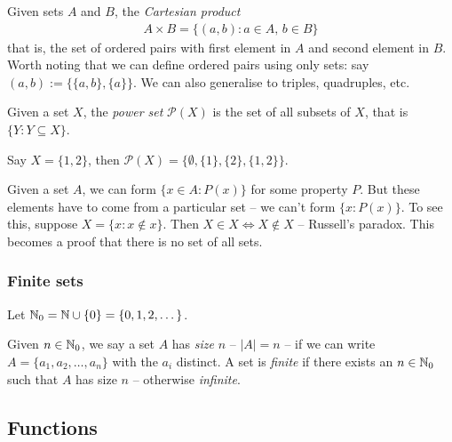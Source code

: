 \documentclass{../template/note}
\begin{document}
    \begin{definition}
        Given sets \(A\) and \(B\), the \emph{Cartesian product}
        \begin{align*}
            A \times B = \{(a, b): a \in A,\, b \in B\}
        \end{align*}
        that is, the set of ordered pairs with first element in \(A\) and second element in \(B\). Worth noting that we can define ordered pairs using only sets: say \((a, b) := \{\{a, b\}, \{a\}\}\). We can also generalise to triples, quadruples, etc.
        
    \end{definition}
    
    \begin{definition}
        Given a set \(X\), the \emph{power set} \(\mathcal P(X)\) is the set of all subsets of \(X\), that is \(\{Y: Y \subseteq X\}\).
    \end{definition}
    
    \begin{example}
        Say \(X = \{1, 2\}\), then \(\mathcal P(X) = \{\emptyset, \{1\}, \{2\}, \{1, 2\}\}\).
    \end{example}
    
    \begin{remark*}
        Given a set \(A\), we can form \(\{x \in A: P(x)\}\) for some property \(P\). But these elements have to come from a particular set -- we can't form \(\{x: P(x)\}\). To see this, suppose \(X = \{x: x \notin x\}\). Then \(X \in X \iff X \notin X\) -- Russell's paradox. This becomes a proof that there is no set of all sets.
    \end{remark*}
    
    \subsubsection{Finite sets}

    Let \(\mathbb N_0 = \mathbb N \cup \{0\} = \{0, 1, 2, \dots\}\). 

    \begin{definition}
        Given \(n \in \mathbb N_0\), we say a set \(A\) has \emph{size} \(n\) -- \(|A| = n\) -- if we can write \(A = \{a_1, a_2, \dots, a_n\}\) with the \(a_i\) distinct. A set is \emph{finite} if there exists an \(n \in \mathbb N_0\) such that \(A\) has size \(n\) -- otherwise \emph{infinite}.
    \end{definition}
    
    \subsection{Functions}
\end{document}
